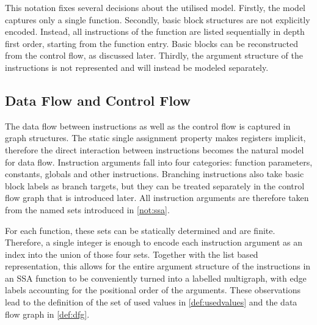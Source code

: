     This notation fixes several decisions about the utilised model.
    Firstly, the model captures only a single function.
    Secondly, basic block structures are not explicitly encoded.
    Instead, all instructions of the function are listed sequentially in depth
    first order, starting from the function entry.
    Basic blocks can be reconstructed from the control flow, as discussed later.
    Thirdly, the argument structure of the instructions is not represented and
    will instead be modeled separately.

\subsection{Data Flow and Control Flow}

    The data flow between instructions as well as the control flow is captured
    in graph structures.
    The static single assignment property makes registers implicit, therefore
    the direct interaction between instructions becomes the natural model for
    data flow.
    Instruction arguments fall into four categories: function parameters,
    constants, globals and other instructions.
    Branching instructions also take basic block labels as branch targets,
    but they can be treated separately in the control flow graph that is
    introduced later.
    All instruction arguments are therefore taken from the named sets introduced
    in \autoref{not:ssa}.

    For each function, these sets can be statically determined and are finite.
    Therefore, a single integer is enough to encode each instruction argument as
    an index into the union of those four sets.
    Together with the list based representation, this allows for the
    entire argument structure of the instructions in an SSA function to be
    conveniently turned into a labelled multigraph, with edge labels accounting
    for the positional order of the arguments.
    These observations lead to the definition of the set of used values in
    \autoref{def:usedvalues} and the data flow graph in \autoref{def:dfg}.

